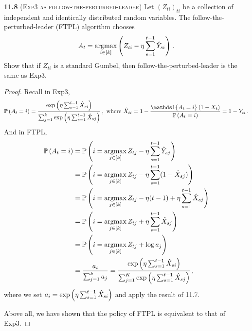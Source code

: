 \noindent\textbf{11.8} (\textsc{Exp3 as follow-the-perturbed-leader}) Let $(Z_{ti})_{ti}$ be a collection of independent and identically distributed random variables. The follow-the-perturbed-leader (FTPL) algorithm chooses
\begin{align*}
A_{t}=\operatorname*{argmax}_{i \in[k]}\left(Z_{ti}-\eta \sum_{s=1}^{t-1} \hat{Y}_{s i}\right)\,.
\end{align*}
Show that if $Z_{ti}$ is a standard Gumbel, then follow-the-perturbed-leader is the same as Exp3. 
\begin{proof}
Recall in Exp3, 
\begin{align*}
    \PP{A_t=i} = \frac{\exp\bracket{\eta \sum_{s=1}^{t-1} \hat{X}_{si} }}{\sum_{j=1}^k \exp\bracket{\eta \sum_{s=1}^{t-1} \hat{X}_{sj} }} \,, \text{ where } \hat{X}_{ti} = 1-\frac{ \bOne{A_t=i}(1-X_t) }{\PP{A_t=i} } = 1-Y_{ti}\,. 
 \end{align*}
 And in FTPL, 
 \begin{align*}
\mathbb{P} \left(A_t=i\right) &= \mathbb{P} \left( i =\operatorname*{argmax}_{j\in[k]} Z_{tj}-\eta \sum_{s=1}^{t-1} \hat{Y}_{sj}\right) \\
&= \mathbb{P} \left( i = \operatorname*{argmax}_{j\in[k]}Z_{tj}-\eta \sum_{s=1}^{t-1} (1-\hat{X}_{sj})  \right) \\
&= \mathbb{P} \left( i = \operatorname*{argmax}_{j\in[k]}Z_{tj}- \eta(t-1)+ \eta \sum_{s=1}^{t-1} \hat{X}_{sj}  \right) \\
&= \mathbb{P} \left( i = \operatorname*{argmax}_{j\in[k]}Z_{tj}+ \eta \sum_{s=1}^{t-1} \hat{X}_{sj}  \right) \\
&= \mathbb{P} \left( i = \operatorname*{argmax}_{j\in[k]}Z_{tj}+ \log a_j  \right)  \\
&= \frac{a_i}{\sum_{j=1}^k a_j} = \frac{\exp\left(\eta \sum_{s=1}^{t-1} \hat{X}_{si} \right)}{\sum_{j=1}^K \exp\left(\eta \sum_{s=1}^{t-1} \hat{X}_{sj} \right)} \,,
 \end{align*}
 where we set $a_i = \exp\left(\eta \sum_{s=1}^{t-1}\hat{X}_{si}\right)$ and apply the result of 11.7. 

 Above all, we have shown that the policy of FTPL is equivalent to that of Exp3. 


\end{proof}

